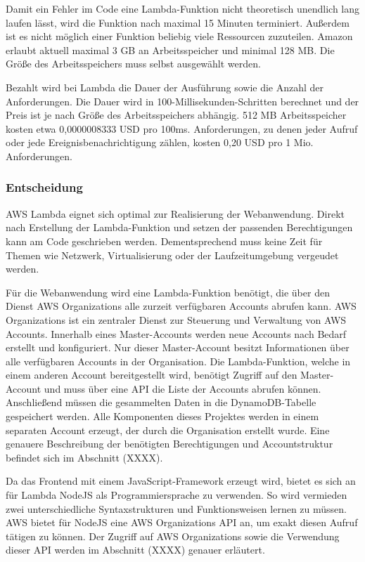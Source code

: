 {Damit ein Fehler im Code eine Lambda-Funktion nicht theoretisch unendlich lang laufen lässt, wird die Funktion nach maximal 15 Minuten terminiert.
Außerdem ist es nicht möglich einer Funktion beliebig viele Ressourcen zuzuteilen.
Amazon erlaubt aktuell maximal 3 GB an Arbeitsspeicher und minimal 128 MB.
Die Größe des Arbeitsspeichers muss selbst ausgewählt werden.

Bezahlt wird bei Lambda die Dauer der Ausführung sowie die Anzahl der Anforderungen.
Die Dauer wird in 100-Millisekunden-Schritten berechnet und der Preis ist je nach Größe des Arbeitsspeichers abhängig.
512 MB Arbeitsspeicher kosten etwa 0,0000008333 USD pro 100ms.
Anforderungen, zu denen jeder Aufruf oder jede Ereignisbenachrichtigung zählen, kosten 0,20 USD pro 1 Mio. Anforderungen.\cite[]{LambdaPreise}

\subsubsection{Entscheidung}
AWS Lambda eignet sich optimal zur Realisierung der Webanwendung.
Direkt nach Erstellung der Lambda-Funktion und setzen der passenden Berechtigungen kann am Code geschrieben werden.
Dementsprechend muss keine Zeit für Themen wie Netzwerk, Virtualisierung oder der Laufzeitumgebung vergeudet werden.

Für die Webanwendung wird eine Lambda-Funktion benötigt, die über den Dienst AWS Organizations alle zurzeit verfügbaren Accounts abrufen kann.
AWS Organizations ist ein zentraler Dienst zur Steuerung und Verwaltung von AWS Accounts.
Innerhalb eines Master-Accounts werden neue Accounts nach Bedarf erstellt und konfiguriert.
Nur dieser Master-Account besitzt Informationen über alle verfügbaren Accounts in der Organisation.
Die Lambda-Funktion, welche in einem anderen Account bereitgestellt wird, benötigt Zugriff auf den Master-Account und muss über eine API die Liste der Accounts abrufen können.
Anschließend müssen die gesammelten Daten in die DynamoDB-Tabelle gespeichert werden.
Alle Komponenten dieses Projektes werden in einem separaten Account erzeugt, der durch die Organisation erstellt wurde.
Eine genauere Beschreibung der benötigten Berechtigungen und Accountstruktur befindet sich im Abschnitt (XXXX).

Da das Frontend mit einem JavaScript-Framework erzeugt wird, bietet es sich an für Lambda NodeJS als Programmiersprache zu verwenden.
So wird vermieden zwei unterschiedliche Syntaxstrukturen und Funktionsweisen lernen zu müssen.
AWS bietet für NodeJS eine AWS Organizations API an, um exakt diesen Aufruf tätigen zu können.
Der Zugriff auf AWS Organizations sowie die Verwendung dieser API werden im Abschnitt (XXXX) genauer erläutert.
\cite[]{SDKListAccounts}

}
